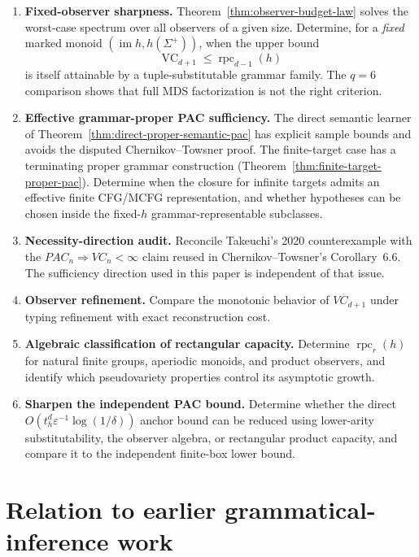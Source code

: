 \documentclass[11pt]{article}
\newcommand{\eps}{\varepsilon}
\newcommand{\VC}{\operatorname{VC}}
\begin{document}
\begin{enumerate}
\item \textbf{Fixed-observer sharpness.}
Theorem~\ref{thm:observer-budget-law} solves the worst-case spectrum over
all observers of a given size. Determine, for a \emph{fixed} marked monoid
\((\operatorname{im}h,h(\Sigma^+))\), when the upper bound
\[
 \VC_{d+1}\le\operatorname{rpc}_{d-1}(h)
\]
is itself attainable by a tuple-substitutable grammar family. The
\(q=6\) comparison shows that full MDS factorization is not the right
criterion.

\item \textbf{Effective grammar-proper PAC sufficiency.} The direct
semantic learner of Theorem~\ref{thm:direct-proper-semantic-pac}
has explicit sample bounds and avoids the disputed
Chernikov--Towsner proof. The finite-target case has a terminating proper grammar
construction (Theorem~\ref{thm:finite-target-proper-pac}).
Determine when the closure for infinite targets admits an
effective finite CFG/MCFG representation,
and whether hypotheses can be chosen inside the
fixed-\(h\) grammar-representable subclasses.

\item \textbf{Necessity-direction audit.} Reconcile Takeuchi's 2020
counterexample with the \(PAC_n\Rightarrow VC_n<\infty\) claim reused in
Chernikov--Towsner's Corollary~6.6.  The sufficiency direction used in this
paper is independent of that issue.

\item \textbf{Observer refinement.} Compare the monotonic behavior of
\(VC_{d+1}\) under typing refinement with exact reconstruction cost.

\item \textbf{Algebraic classification of rectangular capacity.}
Determine \(\operatorname{rpc}_r(h)\) for natural finite groups, aperiodic
monoids, and product observers, and identify which pseudovariety properties
control its asymptotic growth.

\item \textbf{Sharpen the independent PAC bound.} Determine
whether the direct \(O(t_h^d\eps^{-1}\log(1/\delta))\)
anchor bound can be reduced using lower-arity substitutability,
the observer algebra, or rectangular product capacity,
and compare it to the independent finite-box lower bound.
\end{enumerate}

\section{Relation to earlier grammatical-inference work}
\end{document}
